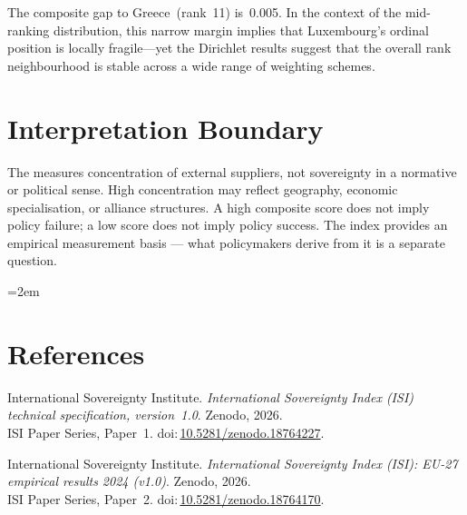 \documentclass[12pt,a4paper]{article}
\begin{document}
The composite gap to Greece~(rank~11) is~0.005.  In the context of the mid-ranking distribution, this narrow margin implies that Luxembourg's ordinal position is locally fragile---yet the Dirichlet results suggest that the overall rank neighbourhood is stable across a wide range of weighting schemes.


\section{Interpretation Boundary}
\label{sec:interpretation}

The \ISI measures concentration of external suppliers, not sovereignty in a normative or political sense.  High concentration may reflect geography, economic specialisation, or alliance structures.  A high composite score does not imply policy failure; a low score does not imply policy success.  The index provides an empirical measurement basis --- what policymakers derive from it is a separate question.


\clearpage
\vspace*{1.5cm}

\begingroup\emergencystretch=2em
\section*{References}

\begin{enumerate}[label={[\arabic*]},leftmargin=2em,itemsep=6pt]
\item International Sovereignty Institute.
  \textit{International Sovereignty Index (ISI) technical specification, version~1.0}.
  Zenodo, 2026.\\ISI Paper Series, Paper~1.
  doi:\,\href{https://doi.org/10.5281/zenodo.18764227}{10.5281/zenodo.18764227}.

\item International Sovereignty Institute.
  \textit{International Sovereignty Index (ISI): EU-27 empirical results 2024 (v1.0)}.
  Zenodo, 2026.\\ISI Paper Series, Paper~2.
  doi:\,\href{https://doi.org/10.5281/zenodo.18764170}{10.5281/zenodo.18764170}.
\end{enumerate}
\endgroup
\end{document}
